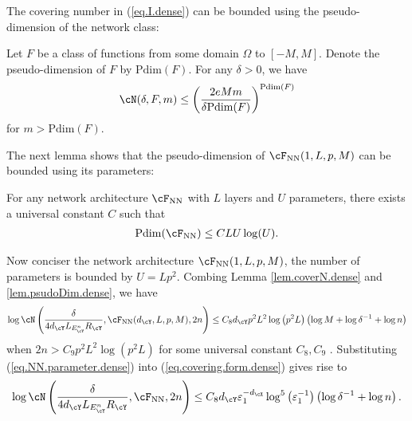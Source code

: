 \documentclass[11pt]{article} %
\newcommand{\Pdim}{\mathrm{Pdim}}
\begin{document}
The covering number in (\ref{eq.I.dense}) can be bounded using the pseudo-dimension of the network class:
\begin{lemma}\label{lem.coverN.dense}
	Let $F$ be a class of functions from some domain $\Omega$ to $[-M,M]$. Denote the pseudo-dimension of $F$ by $\Pdim(F)$. For any $\delta>0$, we have
	\begin{align}
		\cN(\delta,F,m)\leq \left(\frac{2eMm}{\delta \Pdim(F)}\right)^{\Pdim(F)}
	\end{align}
	for $m>\Pdim(F)$.
\end{lemma}
The next lemma shows that the pseudo-dimension of $\cF_{\rm NN}(1,L,p,M)$ can be bounded using its parameters:
\begin{lemma}\label{lem.psudoDim.dense}
	For any network architecture $\cF_{\rm NN}$ with $L$ layers and $U$ parameters, there exists a universal constant $C$ such that
	\begin{align}
		\Pdim(\cF_{\rm NN})\leq CLU\log(U).
	\end{align}
\end{lemma}
Now conciser the network architecture $\cF_{\rm NN}(1,L,p,M)$, the number of parameters is bounded by $U=Lp^2$.
Combing Lemma \ref{lem.coverN.dense} and \ref{lem.psudoDim.dense}, we have
\begin{align}
	\log \cN\left(\frac{\delta}{4d_{\cY}L_{E^n_{\cY}}R_{\cY}},\cF_{\rm NN}(d_{\cY},L,p,M),2n\right)\leq C_{8}d_{\cY}p^2L^2\log\left(p^2L\right)\left(\log M+\log \delta^{-1}+\log n\right)
	\label{eq.covering.form.dense}
\end{align}
when $2n>C_{9}p^2L^2\log(p^2L)$ for some universal constant $C_{8},C_{9}$ .
Substituting (\ref{eq.NN.parameter.dense}) into (\ref{eq.covering.form.dense}) gives rise to
\begin{align}
	\log \cN\left(\frac{\delta}{4d_{\cY}L_{E^n_{\cY}}R_{\cY}},\cF_{\rm NN},2n\right)\leq C_{8} d_{\cY}\varepsilon_1^{-d_{\cX}}\log^5\left(\varepsilon_1^{-1}\right)\left(\log \delta^{-1}+\log n\right).
	\label{eq.NN.coveringLog.dense}
\end{align}
\end{document}
